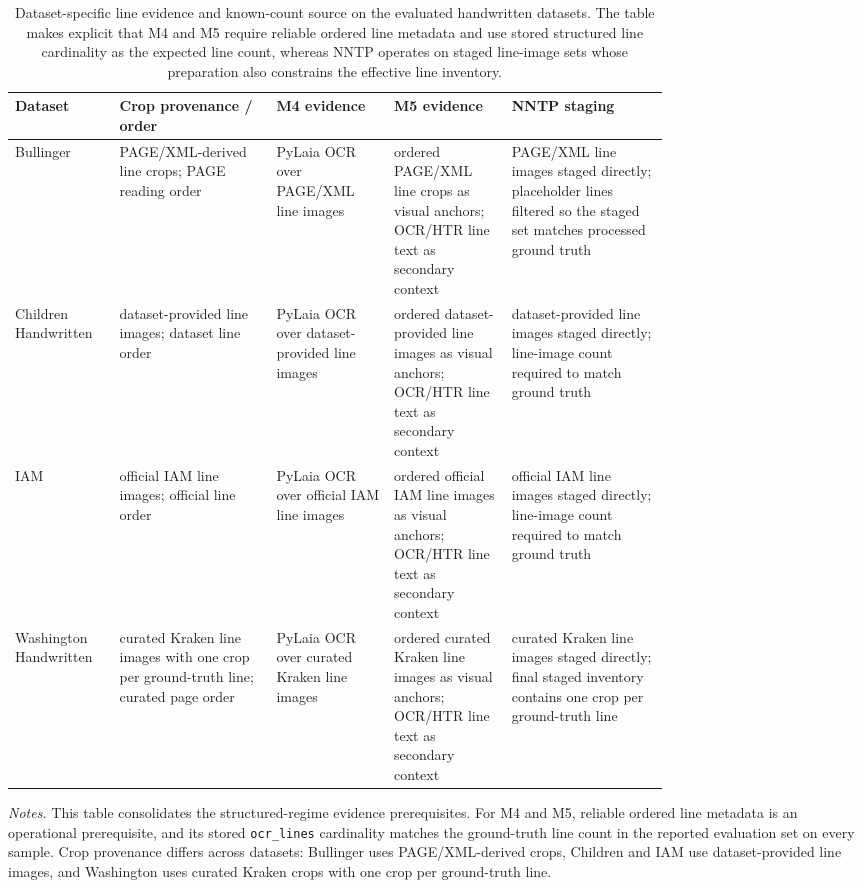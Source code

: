 \begin{table}[H]
  \centering
  \caption{Dataset-specific line evidence and known-count source on the evaluated handwritten datasets. The table makes explicit that M4 and M5 require reliable ordered line metadata and use stored structured line cardinality as the expected line count, whereas NNTP operates on staged line-image sets whose preparation also constrains the effective line inventory.}
  \label{tab:method_line_evidence_sources}
  \footnotesize
  \renewcommand{\arraystretch}{1.08}
  \setlength{\tabcolsep}{4pt}
  \begin{tabularx}{\linewidth}{@{}>{\raggedright\arraybackslash}p{0.16\linewidth}>{\raggedright\arraybackslash}p{0.24\linewidth}>{\raggedright\arraybackslash}p{0.18\linewidth}>{\raggedright\arraybackslash}p{0.18\linewidth}>{\raggedright\arraybackslash}X@{}}
    \toprule
    \textbf{Dataset} & \textbf{Crop provenance / order} & \textbf{M4 evidence} & \textbf{M5 evidence} & \textbf{NNTP staging} \\
    \midrule
    Bullinger & PAGE/XML-derived line crops; PAGE reading order & PyLaia OCR over PAGE/XML line images & ordered PAGE/XML line crops as visual anchors; OCR/HTR line text as secondary context & PAGE/XML line images staged directly; placeholder lines filtered so the staged set matches processed ground truth \\
    Children Handwritten & dataset-provided line images; dataset line order & PyLaia OCR over dataset-provided line images & ordered dataset-provided line images as visual anchors; OCR/HTR line text as secondary context & dataset-provided line images staged directly; line-image count required to match ground truth \\
    IAM & official IAM line images; official line order & PyLaia OCR over official IAM line images & ordered official IAM line images as visual anchors; OCR/HTR line text as secondary context & official IAM line images staged directly; line-image count required to match ground truth \\
    Washington Handwritten & curated Kraken line images with one crop per ground-truth line; curated page order & PyLaia OCR over curated Kraken line images & ordered curated Kraken line images as visual anchors; OCR/HTR line text as secondary context & curated Kraken line images staged directly; final staged inventory contains one crop per ground-truth line \\
    \bottomrule
  \end{tabularx}
\par\vspace{0.35em}
  \parbox{0.98\linewidth}{\footnotesize\raggedright \textit{Notes.} This table consolidates the structured-regime evidence prerequisites. For M4 and M5, reliable ordered line metadata is an operational prerequisite, and its stored \texttt{ocr\_lines} cardinality matches the ground-truth line count in the reported evaluation set on every sample. Crop provenance differs across datasets: Bullinger uses PAGE/XML-derived crops, Children and IAM use dataset-provided line images, and Washington uses curated Kraken crops with one crop per ground-truth line.}
\end{table}

